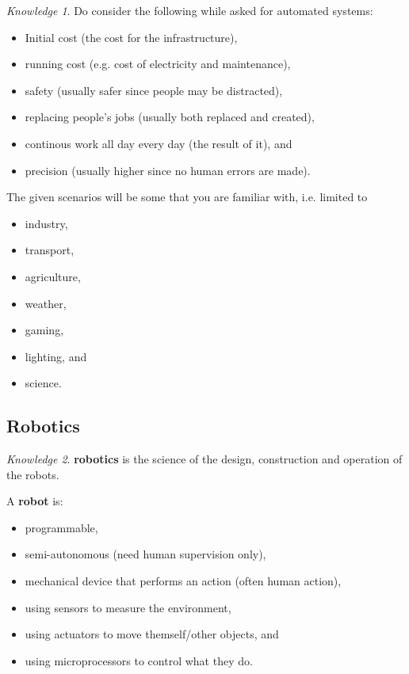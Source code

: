 \documentclass[8pt]{article}
\theoremstyle{remark}
\newtheorem{knowledge}{Knowledge}[subsection]
\begin{document}
            \begin{knowledge}
                Do consider the following while asked for automated systems:
                \begin{itemize}
                    \item Initial cost (the cost for the infrastructure),
                    \item running cost (e.g. cost of electricity and maintenance),
                    \item safety (usually safer since people may be distracted),
                    \item replacing people's jobs (usually both replaced and created),
                    \item continous work all day every day (the result of it), and
                    \item precision (usually higher since no human errors are made).
                \end{itemize}

                The given scenarios will be some that you are familiar with, i.e. limited to
                \begin{itemize}
                    \item industry,
                    \item transport,
                    \item agriculture,
                    \item weather,
                    \item gaming,
                    \item lighting, and
                    \item science.
                \end{itemize}
            \end{knowledge}

        \subsection{Robotics}

            \begin{knowledge}
                \textbf{robotics} is the science of the design, construction and operation of the robots.
                
                A \textbf{robot} is:
                \begin{itemize}
                    \item programmable,
                    \item semi-autonomous (need human supervision only),
                    \item mechanical device that performs an action (often human action),
                    \item using sensors to measure the environment,
                    \item using actuators to move themself/other objects, and
                    \item using microprocessors to control what they do.
                \end{itemize}
            \end{knowledge}
\end{document}
